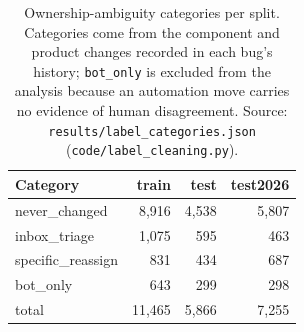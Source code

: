 \begin{table}[t]\centering
\small
\caption{Ownership-ambiguity categories per split. Categories come from the component and product changes recorded in each bug's history; \texttt{bot\_only} is excluded from the analysis because an automation move carries no evidence of human disagreement. Source: \texttt{results/label\_categories.json} (\texttt{code/label\_cleaning.py}).}
\label{tab:categories}
\begin{tabular}{lrrr}
\toprule
Category & train & test & test2026 \\
\midrule
never\_changed & 8{,}916 & 4{,}538 & 5{,}807 \\
inbox\_triage & 1{,}075 & 595 & 463 \\
specific\_reassign & 831 & 434 & 687 \\
bot\_only & 643 & 299 & 298 \\
\midrule
total & 11{,}465 & 5{,}866 & 7{,}255 \\
\bottomrule
\end{tabular}
\end{table}
